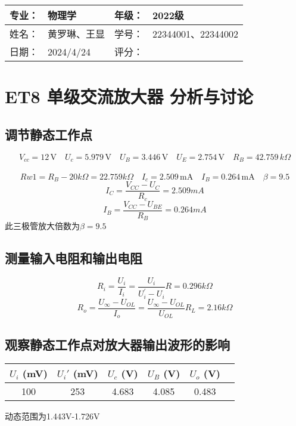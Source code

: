 \documentclass[dvipsnames, svgnames,a4paper,11pt]{article}
\begin{document}
	
	
	\clearpage
	
	\begin{table}
		\renewcommand\arraystretch{1.7}
		\begin{tabularx}{\textwidth}{|X|X|X|X|}
			\hline
			专业：& 物理学 &年级：& 2022级\\
			\hline
			姓名： &黄罗琳、王显  & 学号：& 22344001、22344002\\
			\hline
			日期：&  2024/4/24& 评分： &\\
			\hline
		\end{tabularx}
	\end{table}
	
	\section{ET8 单级交流放大器 \quad\heiti 分析与讨论}
	
	\subsection{调节静态工作点}
	$$
V_{cc} = 12 \, \mathrm{V} \quad 
U_c = 5.979 \, \mathrm{V} \quad 
U_B = 3.446 \, \mathrm{V} \quad 
U_E = 2.754 \, \mathrm{V} \quad 
R_B = 42.759 \,k\Omega $$\\$$
Rw1 = R_B - 20 k\Omega = 22.759 k\Omega \quad 
I_c = 2.509 \, \mathrm{mA} \quad 
I_B = 0.264 \, \mathrm{mA} \quad 
\beta = 9.5
$$
	$$I_C=\frac{V_{CC}-U_C}{R_c}=2.509mA$$
	$$I_{B}=\frac{V_{CC}-U_{BE}}{R_{B}}=0.264m A$$
	此三极管放大倍数为$\beta = 9.5$
	\subsection{测量输入电阻和输出电阻}
	$$R_i=\frac{U_i}{I_i}=\frac{U_i}{U_i^{'}-U_i}R=0.296k\Omega$$
	$$R_{o}=\frac{U_{\infty}-U_{OL}}{I_{o}}=\frac{U_{\infty}-U_{OL}}{U_{OL}}R_{L}=2.16k\Omega$$
	\subsection{观察静态工作点对放大器输出波形的影响}
	\begin{center}
		\begin{tabular}{|c|c|c|c|c|c|}
		\hline
		$U_i$ (mV) & $U_i'$ (mV) & $U_c$ (V) & $U_B$ (V) & $U_o$ (V) \\
		\hline
		100 & 253 & 4.683 & 4.085 & 0.483 \\
		\hline
		\end{tabular}
		\end{center}
	动态范围为1.443V-1.726V
\end{document}
